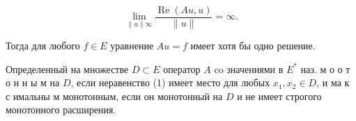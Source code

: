 \documentclass[10pt]{article}
\begin{document}
\[

\lim _{\|u\| \infty} \frac{\operatorname{Re}(A u, u)}{\|u\|}=\infty .

\]



Тогда для любого $f \in E$ уравнение $A u=f$ имеет хотя бы одно решение.



Определенный на множестве $D \subset E$ оператор $A$ co значениями в $E^{*}$ наз. м о о т о н н ы м на $D$, если неравенство (1) имеет место для любых $x_{1}, x_{2} \in D$, и ма к с имальны м монотонным, если он монотонный на $D$ и не имеет строгого монотонного расширения.
\end{document}
